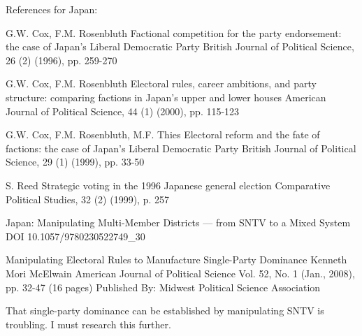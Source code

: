\begin{todo}
    References for Japan:

    G.W. Cox, F.M. Rosenbluth
    Factional competition for the party endorsement: the case of Japan's Liberal Democratic Party
    British Journal of Political Science, 26 (2) (1996), pp. 259-270

    G.W. Cox, F.M. Rosenbluth
    Electoral rules, career ambitions, and party structure: comparing factions in Japan's upper and lower houses
    American Journal of Political Science, 44 (1) (2000), pp. 115-123

    G.W. Cox, F.M. Rosenbluth, M.F. Thies
    Electoral reform and the fate of factions: the case of Japan's Liberal Democratic Party
    British Journal of Political Science, 29 (1) (1999), pp. 33-50

    S. Reed
    Strategic voting in the 1996 Japanese general election
    Comparative Political Studies, 32 (2) (1999), p. 257

    Japan: Manipulating Multi-Member Districts — from SNTV to a Mixed System
    DOI 10.1057/9780230522749\_30

    Manipulating Electoral Rules to Manufacture Single-Party Dominance
    Kenneth Mori McElwain
    American Journal of Political Science
    Vol. 52, No. 1 (Jan., 2008), pp. 32-47 (16 pages)
    Published By: Midwest Political Science Association
\end{todo}

That single-party dominance can be established by manipulating SNTV is troubling.  I must research this further.
